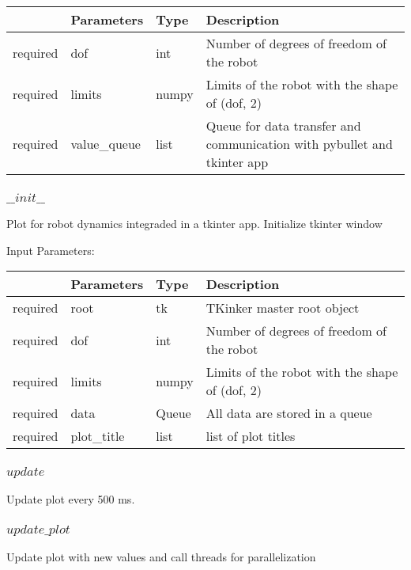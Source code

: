 \documentclass[
	ngerman,
	accentcolor=9c,%
	type=intern,
	marginpar=false
	]{tudapub}
\begin{document}
\begin{tabular}{|p{}|p{}|p{}| p{}|}
\hline
 & \textbf{Parameters} & \textbf{Type} & \textbf{Description} \\
\hline
required & dof & int & Number of degrees of freedom of the robot \\
\hline
required & limits & numpy & Limits of the robot with the shape of (dof, 2) \\
\hline
required & value\_queue & list & Queue for data transfer and communication with pybullet and tkinter app \\
\hline
\end{tabular}
\vspace{1cm}


\subsubsection{$\_\_init\_\_$}
\noindent Plot for robot dynamics integraded in a tkinter app. Initialize tkinter window


\vspace{0.5cm}
\noindent Input Parameters:
\vspace{0.5cm}

\begin{tabular}{|p{}|p{}|p{}| p{}|}
\hline
 & \textbf{Parameters} & \textbf{Type} & \textbf{Description} \\
\hline
required & root & tk & TKinker master root object \\
\hline
required & dof & int & Number of degrees of freedom of the robot\\
\hline
required & limits & numpy & Limits of the robot with the shape of (dof, 2) \\
\hline
required & data & Queue & All data are stored in a queue\\
\hline
required & plot\_title & list & list of plot titles \\
\hline
\end{tabular}
\vspace{1cm}


\subsubsection{$update$}
\noindent Update plot every 500 ms.
\vspace{1cm}

\subsubsection{$update\_plot$}
\noindent Update plot with new values and call threads for parallelization
\end{document}
